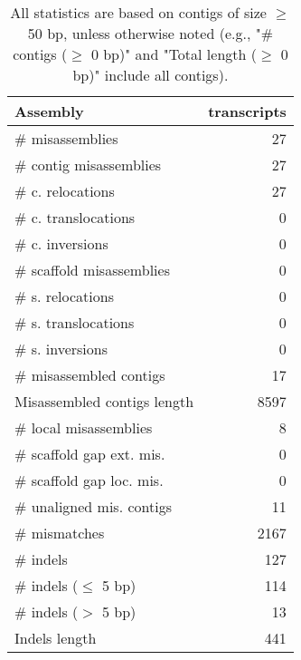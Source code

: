 \documentclass[12pt,a4paper]{article}
\begin{document}
\begin{table}[ht]
\begin{center}
\caption{All statistics are based on contigs of size $\geq$ 50 bp, unless otherwise noted (e.g., "\# contigs ($\geq$ 0 bp)" and "Total length ($\geq$ 0 bp)" include all contigs).}
\begin{tabular}{|l*{1}{|r}|}
\hline
Assembly & transcripts \\ \hline
\# misassemblies & 27 \\ \hline
\hspace{2mm}\# contig misassemblies & 27 \\ \hline
\hspace{5mm}\# c. relocations & 27 \\ \hline
\hspace{5mm}\# c. translocations & 0 \\ \hline
\hspace{5mm}\# c. inversions & 0 \\ \hline
\hspace{2mm}\# scaffold misassemblies & 0 \\ \hline
\hspace{5mm}\# s. relocations & 0 \\ \hline
\hspace{5mm}\# s. translocations & 0 \\ \hline
\hspace{5mm}\# s. inversions & 0 \\ \hline
\# misassembled contigs & 17 \\ \hline
Misassembled contigs length & 8597 \\ \hline
\# local misassemblies & 8 \\ \hline
\# scaffold gap ext. mis. & 0 \\ \hline
\# scaffold gap loc. mis. & 0 \\ \hline
\# unaligned mis. contigs & 11 \\ \hline
\# mismatches & 2167 \\ \hline
\# indels & 127 \\ \hline
\hspace{5mm}\# indels ($\leq$ 5 bp) & 114 \\ \hline
\hspace{5mm}\# indels ($>$ 5 bp) & 13 \\ \hline
Indels length & 441 \\ \hline
\end{tabular}
\end{center}
\end{table}
\end{document}

